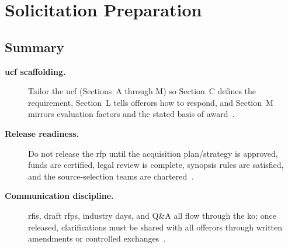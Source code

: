 \documentclass[../main.tex]{subfiles}
\begin{document}
\section{Solicitation Preparation}
\minibib
\subsection{Summary}
\begin{description}
	\item[\textbf{\ac{ucf} scaffolding.}] Tailor the \ac{ucf} (Sections~A through M) so Section~C defines the requirement, Section~L tells offerors how to respond, and Section~M mirrors evaluation factors and the stated basis of award~\autocite{FAR,edo-3-2-2-solicitation-prep-2025}.
	\item[\textbf{Release readiness.}] Do not release the \ac{rfp} until the acquisition plan/strategy is approved, funds are certified, legal review is complete, synopsis rules are satisfied, and the source-selection teams are chartered~\autocite{FAR,NMCARS,edo-3-2-2-solicitation-prep-2025}.
	\item[\textbf{Communication discipline.}] \acp{rfi}, draft \acp{rfp}, industry days, and Q\&A all flow through the \ac{ko}; once released, clarifications must be shared with all offerors through written amendments or controlled exchanges~\autocite{FAR,edo-3-2-2-solicitation-prep-2025}.
\end{description}
\end{document}
